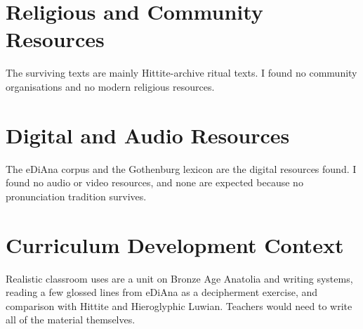 \documentclass[12pt]{article}
\begin{document}
\section{Religious and Community Resources}
The surviving texts are mainly Hittite-archive ritual texts. I found no community organisations and no modern religious resources.

\section{Digital and Audio Resources}
The eDiAna corpus and the Gothenburg lexicon are the digital resources found. I found no audio or video resources, and none are expected because no pronunciation tradition survives.

\section{Curriculum Development Context}
Realistic classroom uses are a unit on Bronze Age Anatolia and writing systems, reading a few glossed lines from eDiAna as a decipherment exercise, and comparison with Hittite and Hieroglyphic Luwian. Teachers would need to write all of the material themselves.
\end{document}
